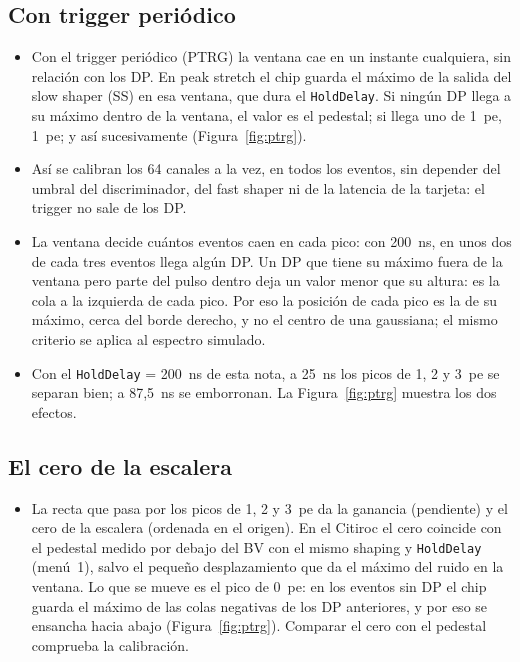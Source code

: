 \documentclass[11pt,a4paper]{article}
\begin{document}
\subsection*{Con trigger periódico}



\begin{itemize}
\item Con el trigger periódico (PTRG) la ventana cae en un instante
  cualquiera, sin relación con los DP. En peak stretch el chip guarda el
  máximo de la salida del slow shaper (SS) en esa ventana, que dura el
  \texttt{HoldDelay}. Si ningún DP llega a su máximo dentro de la ventana,
  el valor es el pedestal; si llega uno de 1~pe, 1~pe; y así sucesivamente
  (Figura~\ref{fig:ptrg}).
\item Así se calibran los 64 canales a la vez, en todos los eventos, sin
  depender del umbral del discriminador, del fast shaper ni de la latencia
  de la tarjeta: el trigger no sale de los DP.
\item La ventana decide cuántos eventos caen en cada pico: con 200~ns, en
  unos dos de cada tres eventos llega algún DP. Un DP que tiene su máximo
  fuera de la ventana pero parte del pulso dentro deja un valor menor que
  su altura: es la cola a la izquierda de cada pico. Por eso la posición de
  cada pico es la de su máximo, cerca del borde derecho, y no el centro de
  una gaussiana; el mismo criterio se aplica al espectro simulado.
\item Con el \texttt{HoldDelay} = 200~ns de esta nota, a 25~ns los picos
  de 1, 2 y 3~pe se separan bien; a 87,5~ns se emborronan. La
  Figura~\ref{fig:ptrg} muestra los dos efectos.
\end{itemize}

\subsection*{El cero de la escalera}

\begin{itemize}
\item La recta que pasa por los picos de 1, 2 y 3~pe da la ganancia
  (pendiente) y el cero de la escalera (ordenada en el origen). En el
  Citiroc el cero coincide con el pedestal medido por debajo del BV con el
  mismo shaping y \texttt{HoldDelay} (menú~1), salvo el pequeño
  desplazamiento que da el máximo del ruido en la ventana. Lo que se mueve
  es el pico de 0~pe: en los eventos sin DP el chip guarda el máximo de las
  colas negativas de los DP anteriores, y por eso se ensancha hacia abajo
  (Figura~\ref{fig:ptrg}). Comparar el cero con el pedestal comprueba la
  calibración.
\end{itemize}
\end{document}
